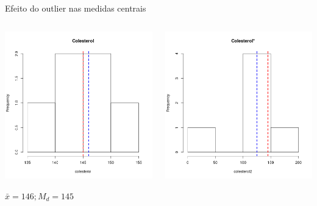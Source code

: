 \documentclass{beamer}
\begin{document}
\begin{frame}{\scriptsize Efeito do outlier nas medidas centrais}
  \begin{columns}
    \begin{column}{5cm}
      \begin{center}
        \includegraphics[width=\textwidth]{Cap3/histograma-colesterol}

        \scriptsize
        \bigskip
        $\bar{x} = 146 ; M_d= 145$
      \end{center}

    \end{column}
    \begin{column}{5cm}
      \begin{center}
        \includegraphics[width=\textwidth]{Cap3/histograma-colesterol2}


\end{center}
\end{column}
\end{columns}
\end{frame}
\end{document}
